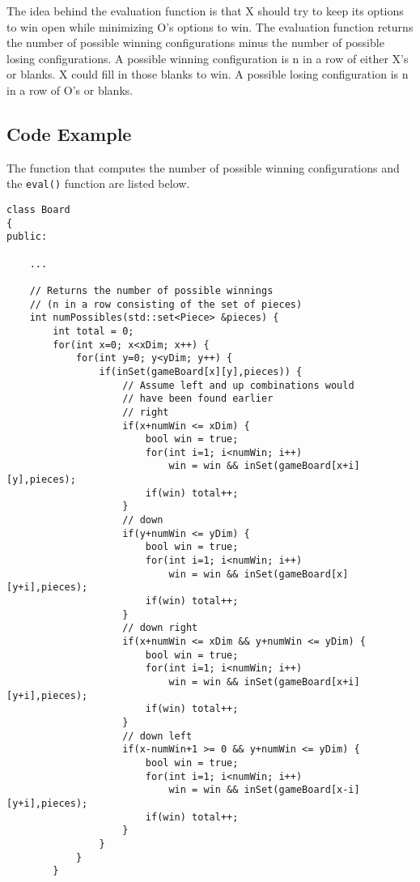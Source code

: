 \documentclass[10pt]{article}
\begin{document}
The idea behind the evaluation function is that X should try to keep its 
options to win open while minimizing O's options to win.  The evaluation 
function returns the number of possible winning configurations minus the
number of possible losing configurations.  A possible winning configuration
is n in a row of either X's or blanks.  X could fill in those blanks to win.
A possible losing configuration is n in a row of O's or blanks.

\subsection{Code Example}
The function that computes the number of possible winning configurations
and the {\tt eval()} function are listed below.

\begin{verbatim}
class Board 
{
public:
    
    ...

    // Returns the number of possible winnings 
    // (n in a row consisting of the set of pieces)
    int numPossibles(std::set<Piece> &pieces) {
        int total = 0;
        for(int x=0; x<xDim; x++) {
            for(int y=0; y<yDim; y++) {
                if(inSet(gameBoard[x][y],pieces)) {
                    // Assume left and up combinations would 
                    // have been found earlier
                    // right
                    if(x+numWin <= xDim) {
                        bool win = true;
                        for(int i=1; i<numWin; i++)
                            win = win && inSet(gameBoard[x+i][y],pieces);
                        if(win) total++;
                    }
                    // down
                    if(y+numWin <= yDim) {
                        bool win = true;
                        for(int i=1; i<numWin; i++)
                            win = win && inSet(gameBoard[x][y+i],pieces);
                        if(win) total++;
                    }
                    // down right
                    if(x+numWin <= xDim && y+numWin <= yDim) {
                        bool win = true;
                        for(int i=1; i<numWin; i++)
                            win = win && inSet(gameBoard[x+i][y+i],pieces);
                        if(win) total++;
                    }
                    // down left
                    if(x-numWin+1 >= 0 && y+numWin <= yDim) {
                        bool win = true;
                        for(int i=1; i<numWin; i++)
                            win = win && inSet(gameBoard[x-i][y+i],pieces);
                        if(win) total++;
                    }
                }
            }
        }


\end{verbatim}
\end{document}
